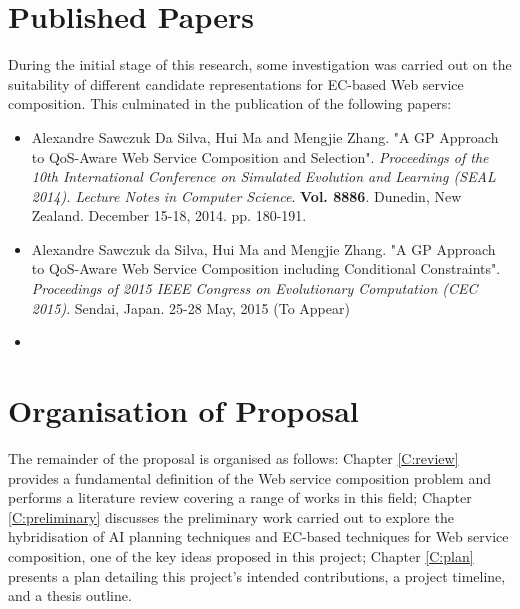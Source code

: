 \section{Published Papers}

During the initial stage of this research, some investigation was carried out on the suitability of different candidate representations for EC-based Web service composition. This culminated in the publication of the following papers:

\begin{itemize}
 \item Alexandre Sawczuk Da Silva, Hui Ma and Mengjie Zhang. "A GP Approach to QoS-Aware Web Service Composition and Selection". \textit{Proceedings of the 10th International Conference on Simulated Evolution and Learning (SEAL 2014). Lecture Notes in Computer Science}. \textbf{Vol. 8886}. Dunedin, New Zealand. December 15-18, 2014. pp. 180-191.
 \item Alexandre Sawczuk da Silva, Hui Ma and Mengjie Zhang. "A GP Approach to QoS-Aware Web Service Composition including Conditional Constraints". \textit{Proceedings of 2015 IEEE Congress on Evolutionary Computation (CEC 2015)}. Sendai, Japan. 25-28 May, 2015 (To Appear)
 \item
\end{itemize}


\section{Organisation of Proposal}
The remainder of the proposal is organised as follows: Chapter \ref{C:review} provides a fundamental definition of the Web service composition problem and performs a literature review covering a range of works in this field; Chapter \ref{C:preliminary} discusses the preliminary work carried out to explore the hybridisation of AI planning techniques and EC-based techniques for Web service composition, one of the key ideas proposed in this project; Chapter \ref{C:plan} presents a plan detailing this project's intended contributions, a project timeline, and a thesis outline.
